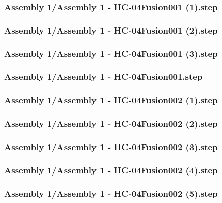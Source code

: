 \documentclass[a4paper,12pt]{article}
\begin{document}
\begin{lstlising}[language=C++]
\subsubsection{Assembly 1/Assembly 1 - HC-04Fusion001 (1).step}

\subsubsection{Assembly 1/Assembly 1 - HC-04Fusion001 (2).step}

\subsubsection{Assembly 1/Assembly 1 - HC-04Fusion001 (3).step}

\subsubsection{Assembly 1/Assembly 1 - HC-04Fusion001.step}

\subsubsection{Assembly 1/Assembly 1 - HC-04Fusion002 (1).step}

\subsubsection{Assembly 1/Assembly 1 - HC-04Fusion002 (2).step}

\subsubsection{Assembly 1/Assembly 1 - HC-04Fusion002 (3).step}

\subsubsection{Assembly 1/Assembly 1 - HC-04Fusion002 (4).step}

\subsubsection{Assembly 1/Assembly 1 - HC-04Fusion002 (5).step}


\end{lstlising}
\end{document}
